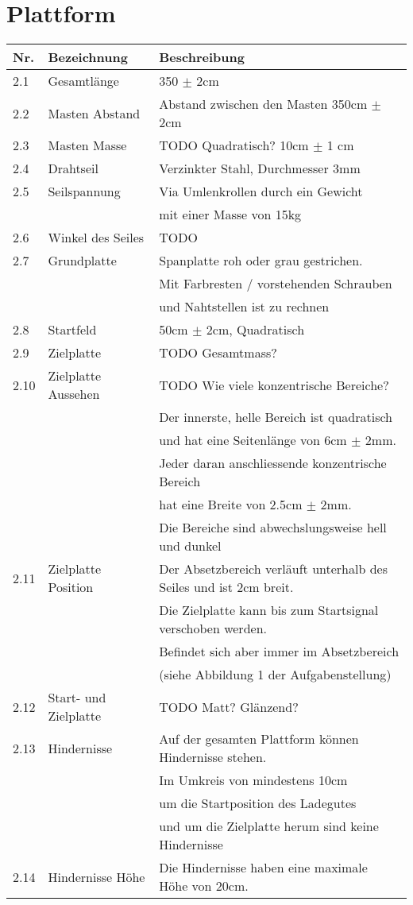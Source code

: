 \documentclass[a4paper]{report}
\begin{document}
\section{Plattform}
\begin{tabular}{|l|l|l|}
	\hline 
	\textbf{Nr.} & \textbf{Bezeichnung} & \textbf{Beschreibung} \\
	\hline 
	2.1 & Gesamtlänge & 350 $\pm$ 2cm \\ 
	\hline 
	2.2 & Masten Abstand & Abstand zwischen den Masten 350cm $\pm$ 2cm \\
	\hline
	2.3 & Masten Masse & TODO Quadratisch? 10cm $\pm$ 1 cm \\
	\hline
	2.4 & Drahtseil & Verzinkter Stahl, Durchmesser 3mm \\ 
	\hline 
	2.5 & Seilspannung & Via Umlenkrollen durch ein Gewicht\\
	& & mit einer Masse von 15kg \\ 
	\hline 
	2.6 & Winkel des Seiles & TODO \\
	\hline
	2.7 & Grundplatte & Spanplatte roh oder grau gestrichen.\\
	& & Mit Farbresten / vorstehenden Schrauben\\
	& & und Nahtstellen ist zu rechnen \\
	\hline
	2.8 & Startfeld & 50cm $\pm$ 2cm, Quadratisch \\ 
	\hline 
	2.9 & Zielplatte & TODO Gesamtmass? \\ 
	\hline 
	2.10 & Zielplatte Aussehen & TODO Wie viele konzentrische Bereiche?\\
	& & Der innerste, helle Bereich ist quadratisch\\
	& & und hat eine Seitenlänge von 6cm $\pm$ 2mm. \\
	& & Jeder daran anschliessende konzentrische Bereich\\
	& & hat eine Breite von 2.5cm $\pm$ 2mm. \\
	& & Die Bereiche sind abwechslungsweise hell und dunkel \\ 
	\hline 
	2.11 & Zielplatte Position & Der Absetzbereich verläuft unterhalb des Seiles und ist 2cm breit.\\
	& & Die Zielplatte kann bis zum Startsignal verschoben werden.\\
	& & Befindet sich aber immer im Absetzbereich\\
	& & (siehe Abbildung 1 der Aufgabenstellung) \\
	\hline
	2.12 & Start- und Zielplatte & TODO Matt? Glänzend? \\
	\hline
	2.13 & Hindernisse & Auf der gesamten Plattform können Hindernisse stehen.\\
	& & Im Umkreis von mindestens 10cm\\
	& & um die Startposition des Ladegutes\\
	& & und um die Zielplatte herum sind keine Hindernisse \\
	\hline
	2.14 & Hindernisse Höhe & Die Hindernisse haben eine maximale Höhe von 20cm. \\
	\hline
\end{tabular} 
\end{document}
